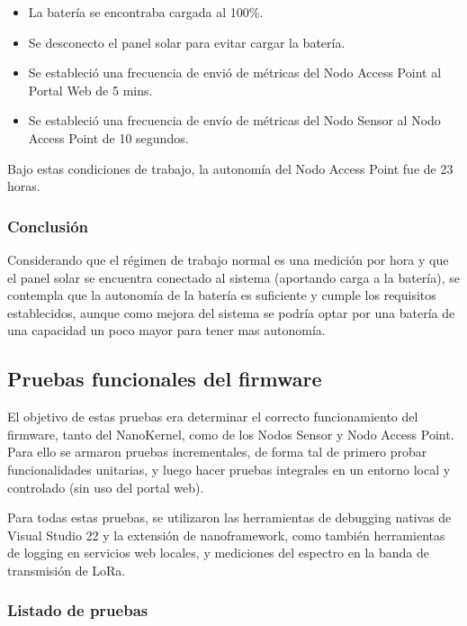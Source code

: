 \begin{itemize}
    \item La batería se encontraba cargada al 100\%.
    \item Se desconecto el panel solar para evitar cargar la batería.
    \item Se estableció una frecuencia de envió de métricas del Nodo Access Point al Portal Web de 5 mins.
    \item Se estableció una frecuencia de envío de métricas del Nodo Sensor al Nodo Access Point de 10 segundos.
\end{itemize}
Bajo estas condiciones de trabajo, la autonomía del Nodo Access Point fue de 23 horas.

\subsubsection{Conclusión}
Considerando que el régimen de trabajo normal es una medición por hora y que el panel solar se encuentra conectado al sistema (aportando carga a la batería), se contempla que la autonomía de la batería es suficiente y cumple los requisitos establecidos, aunque como mejora del sistema se podría optar por una batería de una capacidad un poco mayor para tener mas autonomía. 
\subsection{Pruebas funcionales del firmware}
\label{sec:pruebasFW}

El objetivo de estas pruebas era determinar el correcto funcionamiento del firmware, tanto del NanoKernel, como de los Nodos Sensor y Nodo Access Point. 
Para ello se armaron pruebas incrementales, de forma tal de primero probar funcionalidades unitarias, y luego hacer pruebas integrales en un entorno local y controlado (sin uso del portal web).

Para todas estas pruebas, se utilizaron las herramientas de debugging nativas de Visual Studio 22 y la extensión de nanoframework, como también herramientas de logging en servicios web locales, y mediciones del espectro en la banda de transmisión de LoRa.

\subsubsection{Listado de pruebas}

